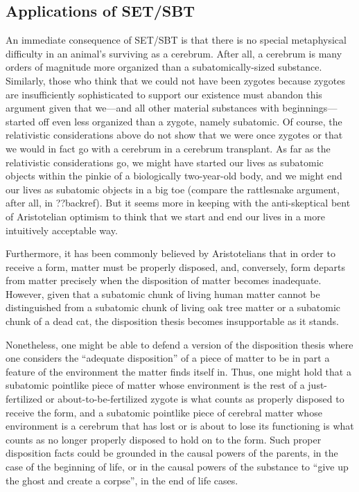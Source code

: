 \subsection{Applications of SET/SBT}
An immediate consequence of SET/SBT is that there is no special metaphysical difficulty in an animal's 
surviving as a cerebrum. After all, a cerebrum is many orders of magnitude more organized than a subatomically-sized
substance. Similarly, those who think that we could not have been zygotes because zygotes are insufficiently sophisticated
to support our existence must abandon this argument given that we---and all other material substances with beginnings---started
off even less organized than a zygote, namely subatomic. Of course, the relativistic considerations above do not 
show that we were once zygotes or that we would in fact go with a cerebrum in a cerebrum transplant. As far as the relativistic 
considerations go, we might have started our lives as subatomic objects within the pinkie of a biologically two-year-old 
body, and we might end our lives as subatomic objects in a big toe (compare the rattlesnake argument, after all, in ??backref).
But it seems more in keeping with the anti-skeptical bent of Aristotelian optimism to think that we start and end our lives 
in a more intuitively acceptable way.

Furthermore, it has been commonly believed by Aristotelians that in order to receive a form, matter must be properly disposed, and,
conversely, form departs from matter precisely when the disposition of matter becomes inadequate. However, given that a subatomic chunk of living human matter cannot be distinguished from a subatomic chunk of living oak tree matter or a subatomic chunk of a dead cat, the disposition thesis becomes insupportable as it stands. 

Nonetheless, one might be able to defend a version of the disposition thesis where one considers the ``adequate disposition'' of 
a piece of matter to be in part a feature of the environment the matter finds itself in. Thus, one might hold that a subatomic
pointlike piece of matter whose environment is the rest of a just-fertilized or about-to-be-fertilized zygote is what counts as 
properly disposed to receive the form, and a subatomic pointlike piece of cerebral matter whose environment is a cerebrum that 
has lost or is about to lose its functioning is what counts as no longer properly disposed to hold on to the form. Such proper
disposition facts could be grounded in the causal powers of the parents, in the case of the beginning of life, or in the causal 
powers of the substance to ``give up the ghost and create a corpse'', in the end of life cases. 

